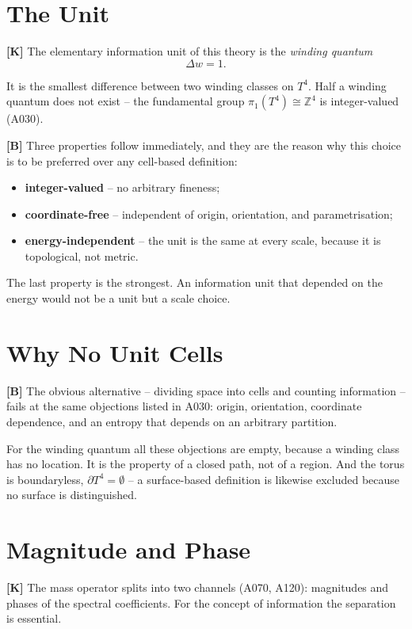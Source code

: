 \section{The Unit}

\textbf{[K]} The elementary information unit of this theory is the
\emph{winding quantum}
\[
  \Delta w = 1 .
\]

It is the smallest difference between two winding classes on $T^4$. Half a
winding quantum does not exist -- the fundamental group
$\pi_1(T^4)\cong\mathbb{Z}^4$ is integer-valued (A030).

\textbf{[B]} Three properties follow immediately, and they are the reason why
this choice is to be preferred over any cell-based definition:

\begin{itemize}
  \item \textbf{integer-valued} -- no arbitrary fineness;
  \item \textbf{coordinate-free} -- independent of origin, orientation, and
    parametrisation;
  \item \textbf{energy-independent} -- the unit is the same at every scale,
    because it is topological, not metric.
\end{itemize}

The last property is the strongest. An information unit that depended on the
energy would not be a unit but a scale choice.

\section{Why No Unit Cells}

\textbf{[B]} The obvious alternative -- dividing space into cells and counting
information -- fails at the same objections listed in A030: origin, orientation,
coordinate dependence, and an entropy that depends on an arbitrary partition.

For the winding quantum all these objections are empty, because a winding class
has no location. It is the property of a closed path, not of a region. And the
torus is boundaryless, $\partial T^4=\emptyset$ -- a surface-based definition is
likewise excluded because no surface is distinguished.

\section{Magnitude and Phase}

\textbf{[K]} The mass operator splits into two channels (A070, A120): magnitudes
and phases of the spectral coefficients. For the concept of information the
separation is essential.

